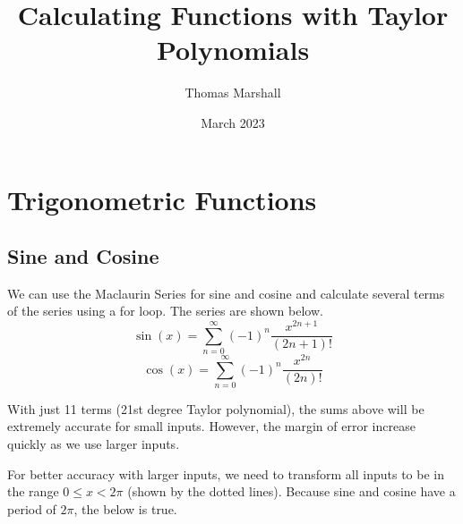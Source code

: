 \documentclass[12pt, letterpaper]{article}
\title{Calculating Functions with Taylor Polynomials}
\author{Thomas Marshall}
\date{March 2023}
\begin{document}
\maketitle

\tableofcontents
\pagebreak

\section{Trigonometric Functions}

\subsection{Sine and Cosine}
We can use the Maclaurin Series for sine and cosine and calculate several terms of the series using a for loop. The series are shown below.
\[ \sin(x) = \sum_{n=0}^{\infty}\left(-1\right)^{n}\frac{x^{2n+1}}{\left(2n+1\right)!} \]
\[ \cos(x) = \sum_{n=0}^{\infty}\left(-1\right)^{n}\frac{x^{2n}}{\left(2n\right)!} \]

With just 11 terms (21st degree Taylor polynomial), the sums above will be extremely accurate for small inputs. However, the margin of error increase quickly as we use larger inputs.

\begin{center}
\end{center}

For better accuracy with larger inputs, we need to transform all inputs to be in the range $0 \leq x < 2\pi$ (shown by the dotted lines).
Because sine and cosine have a period of $2\pi$, the below is true.
\end{document}
